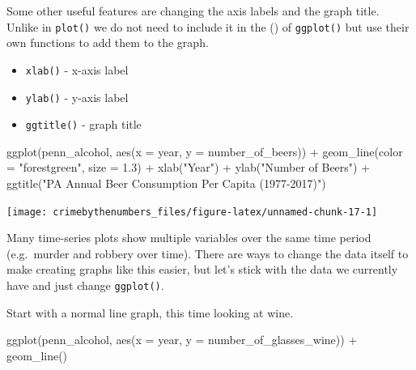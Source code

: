 \documentclass[
  12pt,
]{book}
\newenvironment{Shaded}{\begin{snugshade}}{\end{snugshade}}
\newcommand{\AttributeTok}[1]{\textcolor[rgb]{0.61,0.61,0.61}{#1}}
\newcommand{\FloatTok}[1]{\textcolor[rgb]{0.06,0.06,0.06}{#1}}
\newcommand{\FunctionTok}[1]{\textcolor[rgb]{0,0,0}{#1}}
\newcommand{\NormalTok}[1]{#1}
\newcommand{\SpecialCharTok}[1]{\textcolor[rgb]{0,0,0}{#1}}
\newcommand{\StringTok}[1]{\textcolor[rgb]{0.5,0.5,0.5}{#1}}
\providecommand{\tightlist}{%
  \setlength{\itemsep}{0pt}\setlength{\parskip}{0pt}}
\begin{document}
Some other useful features are changing the axis labels and the graph title. Unlike in \texttt{plot()} we do not need to include it in the () of \texttt{ggplot()} but use their own functions to add them to the graph.

\begin{itemize}
\tightlist
\item
  \texttt{xlab()} - x-axis label
\item
  \texttt{ylab()} - y-axis label
\item
  \texttt{ggtitle()} - graph title
\end{itemize}

\begin{Shaded}
\begin{Highlighting}[]
\FunctionTok{ggplot}\NormalTok{(penn\_alcohol, }\FunctionTok{aes}\NormalTok{(}\AttributeTok{x =}\NormalTok{ year, }\AttributeTok{y =}\NormalTok{ number\_of\_beers)) }\SpecialCharTok{+}
  \FunctionTok{geom\_line}\NormalTok{(}\AttributeTok{color =} \StringTok{"forestgreen"}\NormalTok{, }\AttributeTok{size =} \FloatTok{1.3}\NormalTok{) }\SpecialCharTok{+}
  \FunctionTok{xlab}\NormalTok{(}\StringTok{"Year"}\NormalTok{) }\SpecialCharTok{+}
  \FunctionTok{ylab}\NormalTok{(}\StringTok{"Number of Beers"}\NormalTok{) }\SpecialCharTok{+}
  \FunctionTok{ggtitle}\NormalTok{(}\StringTok{"PA Annual Beer Consumption Per Capita (1977{-}2017)"}\NormalTok{)}
\end{Highlighting}
\end{Shaded}

\begin{center}\texttt{[image: crimebythenumbers\_files/figure-latex/unnamed-chunk-17-1]} \end{center}

Many time-series plots show multiple variables over the same time period (e.g.~murder and robbery over time). There are ways to change the data itself to make creating graphs like this easier, but let's stick with the data we currently have and just change \texttt{ggplot()}.

Start with a normal line graph, this time looking at wine.

\begin{Shaded}
\begin{Highlighting}[]
\FunctionTok{ggplot}\NormalTok{(penn\_alcohol, }\FunctionTok{aes}\NormalTok{(}\AttributeTok{x =}\NormalTok{ year, }\AttributeTok{y =}\NormalTok{ number\_of\_glasses\_wine)) }\SpecialCharTok{+}
  \FunctionTok{geom\_line}\NormalTok{()}
\end{Highlighting}
\end{Shaded}
\end{document}
